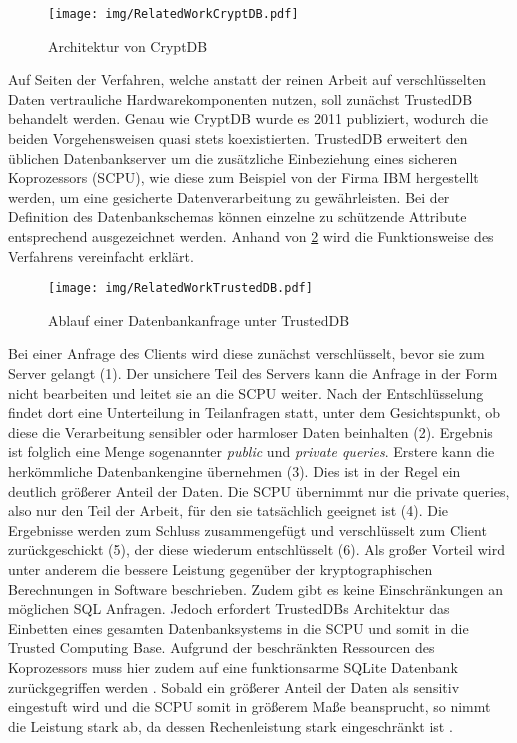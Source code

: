 \begin{figure}
	\texttt{[image: img/RelatedWorkCryptDB.pdf]}
	\centering
	\caption{Architektur von CryptDB}
	\label{fig:cryptdb}
\end{figure}

Auf Seiten der Verfahren, welche anstatt der reinen Arbeit auf verschlüsselten Daten vertrauliche Hardwarekomponenten nutzen, soll zunächst TrustedDB \cite{Bajaj2013} behandelt werden. Genau wie CryptDB wurde es 2011 publiziert, wodurch die beiden Vorgehensweisen quasi stets koexistierten. TrustedDB erweitert den üblichen Datenbankserver um die zusätzliche Einbeziehung eines sicheren Koprozessors (SCPU), wie diese zum Beispiel von der Firma IBM hergestellt werden, um eine gesicherte Datenverarbeitung zu gewährleisten. Bei der Definition des Datenbankschemas können einzelne zu schützende Attribute entsprechend ausgezeichnet werden. Anhand von \ref{fig:trusteddb} wird die Funktionsweise des Verfahrens vereinfacht erklärt. 

\begin{figure}[h]
	\texttt{[image: img/RelatedWorkTrustedDB.pdf]}
	\centering
	\caption{Ablauf einer Datenbankanfrage unter TrustedDB}
	\label{fig:trusteddb}
\end{figure}

Bei einer Anfrage des Clients wird diese zunächst verschlüsselt, bevor sie zum Server gelangt (1). Der unsichere Teil des Servers kann die Anfrage in der Form nicht bearbeiten und leitet sie an die SCPU weiter. Nach der Entschlüsselung findet dort eine Unterteilung in Teilanfragen statt, unter dem Gesichtspunkt, ob diese die Verarbeitung sensibler oder harmloser Daten beinhalten (2). Ergebnis ist folglich eine Menge sogenannter \textit{public} und \textit{private queries}. Erstere kann die herkömmliche Datenbankengine übernehmen (3). Dies ist in der Regel ein deutlich größerer Anteil der Daten. Die SCPU übernimmt nur die private queries, also nur den Teil der Arbeit, für den sie tatsächlich geeignet ist (4). Die Ergebnisse werden zum Schluss zusammengefügt und verschlüsselt zum Client zurückgeschickt (5), der diese wiederum entschlüsselt (6). Als großer Vorteil wird unter anderem die bessere Leistung gegenüber der kryptographischen Berechnungen in Software beschrieben. Zudem gibt es keine Einschränkungen an möglichen SQL Anfragen. Jedoch erfordert TrustedDBs Architektur das Einbetten eines gesamten Datenbanksystems in die SCPU und somit in die Trusted Computing Base. Aufgrund der beschränkten Ressourcen des Koprozessors muss hier zudem auf eine funktionsarme SQLite Datenbank zurückgegriffen werden \cite{Arasu}. Sobald ein größerer Anteil der Daten als sensitiv eingestuft wird und die SCPU somit in größerem Maße beansprucht, so nimmt die Leistung stark ab, da dessen Rechenleistung stark eingeschränkt ist \cite{Arasu2012}.

